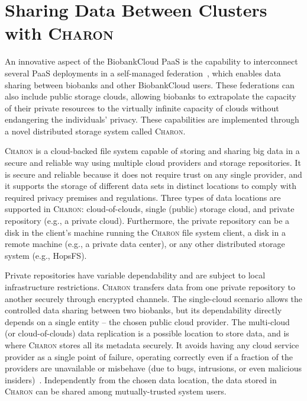 \section{Sharing Data Between Clusters with \textsc{Charon}}

An innovative aspect of the BiobankCloud PaaS is the capability to interconnect several PaaS deployments in a self-managed federation~\cite{ebb13}, which enables data sharing between biobanks and other BiobankCloud users.
These federations can also include public storage clouds, allowing biobanks to extrapolate the capacity of their private resources to the virtually infinite capacity of clouds without endangering the individuals' privacy.
These capabilities are implemented through a novel distributed storage system called \textsc{Charon}.

\textsc{Charon} is a cloud-backed file system capable of storing and sharing big data in a secure and reliable way using multiple cloud providers and storage repositories.
It is secure and reliable because it does not require trust on any single provider, and it supports the storage of different data sets in distinct locations to comply with required privacy premises and regulations.
Three types of data locations are supported in \textsc{Charon}: cloud-of-clouds, single (public) storage cloud, and private repository (e.g., a private cloud).
Furthermore, the private repository can be a disk in the client's machine running the \textsc{Charon} file system client, a disk in a remote machine (e.g., a private data center), or any other distributed storage system (e.g., HopsFS).

Private repositories have variable dependability and are subject to local infrastructure restrictions.
\textsc{Charon} transfers data from one private repository to another securely through encrypted channels.
The single-cloud scenario allows the controlled data sharing between two biobanks, but its dependability directly depends on a single entity -- the chosen public cloud provider.
The multi-cloud (or cloud-of-clouds) data replication is a possible location to store data, and is where \textsc{Charon} stores all its metadata securely.
It avoids having any cloud service provider as a single point of failure, operating correctly even if a fraction of the providers are unavailable or misbehave (due to bugs, intrusions, or even malicious insiders)~\cite{depsky13}.
Independently from the chosen data location, the data stored in \textsc{Charon} can be shared among mutually-trusted system users.

